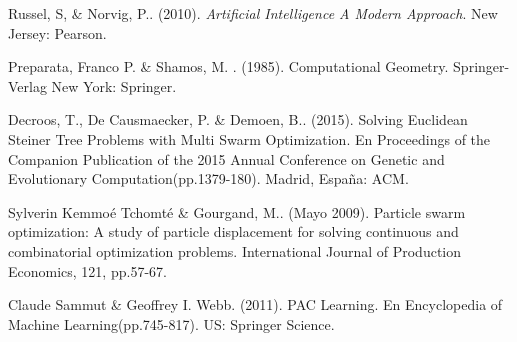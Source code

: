 \documentclass[11pt,letterpaper]{article}
\begin{document}
\begin{thebibliography}{7}

Russel, S, \& Norvig, P.. (2010). \textit{Artificial Intelligence A Modern Approach}. New Jersey: Pearson.

Preparata, Franco P. \& Shamos, M. . (1985). Computational Geometry. Springer-Verlag New York: Springer.

Decroos, T., De Causmaecker, P. \& Demoen, B.. (2015). Solving Euclidean Steiner Tree Problems with Multi Swarm Optimization. En Proceedings of the Companion Publication of the 2015 Annual Conference on Genetic and Evolutionary Computation(pp.1379-180). Madrid, España: ACM.

Sylverin Kemmoé Tchomté \& Gourgand, M.. (Mayo 2009). Particle swarm optimization: A study of particle displacement for solving continuous and combinatorial optimization problems. International Journal of Production Economics, 121, pp.57-67.

Claude Sammut \& Geoffrey I. Webb. (2011). PAC Learning. En Encyclopedia of Machine Learning(pp.745-817). US: Springer Science.
\end{thebibliography} 
\end{document}
